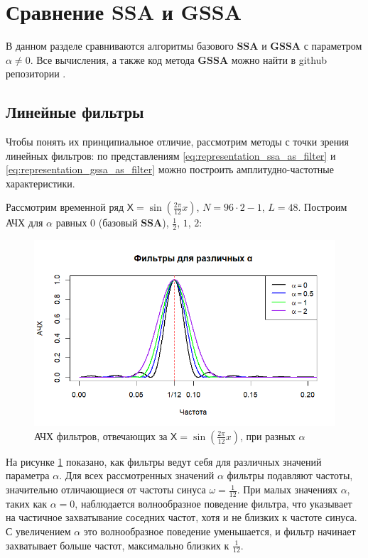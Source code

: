 \documentclass[a4paper, 11pt]{article}
\newcommand{\SSA}{\textbf{SSA}}
\newcommand{\GSSA}{\textbf{GSSA}}
\newcommand{\TS}{\mathsf{X}}
\begin{document}
\newpage




\section{Сравнение SSA и GSSA}
\label{sec:compare_ssa_gssa}
В данном разделе сравниваются алгоритмы базового $\SSA$ и $\GSSA$ с параметром $\alpha \not = 0$. Все вычисления, а также код метода $\GSSA$ можно найти в github репозитории \cite{spbu_cissa_coursework_github}.


\subsection{Линейные фильтры}
Чтобы понять их принципиальное отличие, рассмотрим методы с точки зрения линейных фильтров: по представлениям \eqref{eq:representation_ssa_as_filter} и \eqref{eq:representation_gssa_as_filter} можно построить амплитудно-частотные характеристики.

Рассмотрим временной ряд $\TS = \sin\left(\frac{2\pi}{12}x\right)$, $N = 96 \cdot 2 - 1$, $L = 48$.
Построим АЧХ для $\alpha$ равных $0$ (базовый $\SSA$), $\frac{1}{2}$, $1$, $2$:
\begin{figure}[H]
	\centering
	\includegraphics[width=1\textwidth]{img/various_alphas.png}
	\caption{АЧХ фильтров, отвечающих за $\TS = \sin\left(\frac{2\pi}{12}x\right)$, при разных $\alpha$}
	\label{fig:various_alphas}
\end{figure}
На рисунке \ref{fig:various_alphas} показано, как фильтры ведут себя для различных значений параметра \(\alpha\). Для всех рассмотренных значений \(\alpha\) фильтры подавляют частоты, значительно отличающиеся от частоты синуса $ \omega = \frac{1}{12}$. При малых значениях \(\alpha\), таких как \(\alpha = 0\), наблюдается волнообразное поведение фильтра, что указывает на частичное захватывание соседних частот, хотя и не близких к частоте синуса. С увеличением \(\alpha\) это волнообразное поведение уменьшается, и фильтр начинает захватывает больше частот, максимально близких к \(\frac{1}{12}\).
\end{document}
